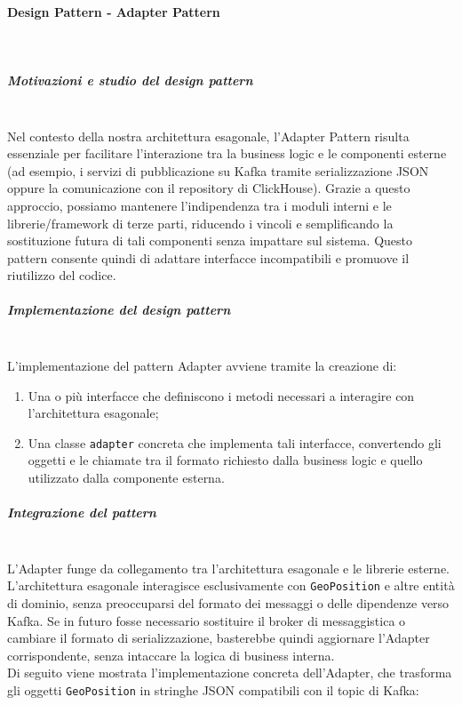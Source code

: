\documentclass[10pt]{article}
\newcommand{\myparagraph}[1]{\paragraph{#1}\mbox{}\\}
\newcommand{\mysubparagraph}[1]{\subparagraph{#1}\mbox{}\\}
\begin{document}
    \myparagraph{Design Pattern - Adapter Pattern}
    \mysubparagraph{Motivazioni e studio del design pattern}
    Nel contesto della nostra architettura esagonale, l’Adapter Pattern risulta essenziale per facilitare l’interazione tra la business logic e le componenti esterne (ad esempio, i servizi di pubblicazione su Kafka tramite serializzazione JSON oppure la comunicazione con il repository di ClickHouse). Grazie a questo approccio, possiamo mantenere l’indipendenza tra i moduli interni e le librerie/framework di terze parti, riducendo i vincoli e semplificando la sostituzione futura di tali componenti senza impattare sul sistema. Questo pattern consente quindi di adattare interfacce incompatibili e promuove il riutilizzo del codice.
    
    \mysubparagraph{Implementazione del design pattern}
    L’implementazione del pattern Adapter avviene tramite la creazione di:
    \begin{enumerate}
        \item Una o più interfacce che definiscono i metodi necessari a interagire con l’architettura esagonale;
        \item Una classe \texttt{adapter} concreta che implementa tali interfacce, convertendo gli oggetti e le chiamate tra il formato richiesto dalla business logic e quello utilizzato dalla componente esterna.
    \end{enumerate}
    
    \mysubparagraph{Integrazione del pattern}
    L’Adapter funge da collegamento tra l’architettura esagonale e le librerie esterne. L’architettura esagonale interagisce esclusivamente con \texttt{GeoPosition} e altre entità di dominio, senza preoccuparsi del formato dei messaggi o delle dipendenze verso Kafka. Se in futuro fosse necessario sostituire il broker di messaggistica o cambiare il formato di serializzazione, basterebbe quindi aggiornare l’Adapter corrispondente, senza intaccare la logica di business interna.\\
    Di seguito viene mostrata l’implementazione concreta dell’Adapter, che trasforma gli oggetti \texttt{GeoPosition} in stringhe JSON compatibili con il topic di Kafka:
    
\end{document}
